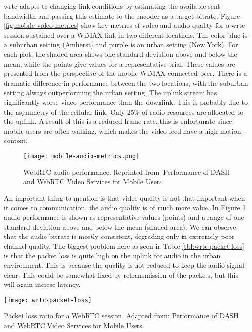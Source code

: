 \gls{wrtc} adapts to changing link conditions by estimating the available sent bandwidth and passing this estimate to the encoder as a target bitrate. Figure \ref{fig:mobile-video-metrics} show key metrics of video and audio quality for a \gls{wrtc} session sustained over a WiMAX link in two different locations. The color blue is a suburban setting (Amherst) and purple is an urban setting (New York). For each plot, the shaded area shows one standard deviation above and below the mean, while the points give values for a representative trial. These values are presented from the perspective of the mobile WiMAX-connected peer. There is a dramatic difference in performance between the two locations, with the suburban setting always outperforming the urban setting. The uplink stream has significantly worse video performance than the downlink. This is probably due to the asymmetry of the cellular link. Only 25\% of radio resources are allocated to the uplink\cite{fund2013performance}. A result of this is a reduced frame rate, this is unfortunate since mobile users are often walking, which makes the video feed have a high motion content.

\pagebreak
\begin{figure}[here]
\centerline{\texttt{[image: mobile-audio-metrics.png]}}
\caption{WebRTC audio performance. Reprinted from: Performance of DASH and WebRTC Video Services for Mobile Users\cite{fund2013performance}.}
\label{fig:mobile-audio-metrics}
\end{figure}

An important thing to mention is that video quality is not that important when it comes to communication, the audio quality is of much more value\cite{fund2013performance}. In Figure \ref{fig:mobile-audio-metrics} audio performance is shown as representative values (points) and a range of one standard deviation above and below the mean (shaded area). We can observe that the audio bitrate is mostly consistent, degrading only in extremely poor channel quality. The biggest problem here as seen in Table \ref{tbl:wrtc-packet-loss} is that the packet loss is quite high on the uplink for audio in the urban environment. This is because the quality is not reduced to keep the audio signal clear. This could be somewhat fixed by retransmission of the packets, but this will again increse latency.
\\
\begin{table}[here]
\centerline{\texttt{[image: wrtc-packet-loss]}}
\caption{Packet loss ratio for a WebRTC session. Adapted from: Performance of DASH and WebRTC Video Services for Mobile Users\cite{fund2013performance}.}
\label{tbl:wrtc-packet-loss}
\end{table}

